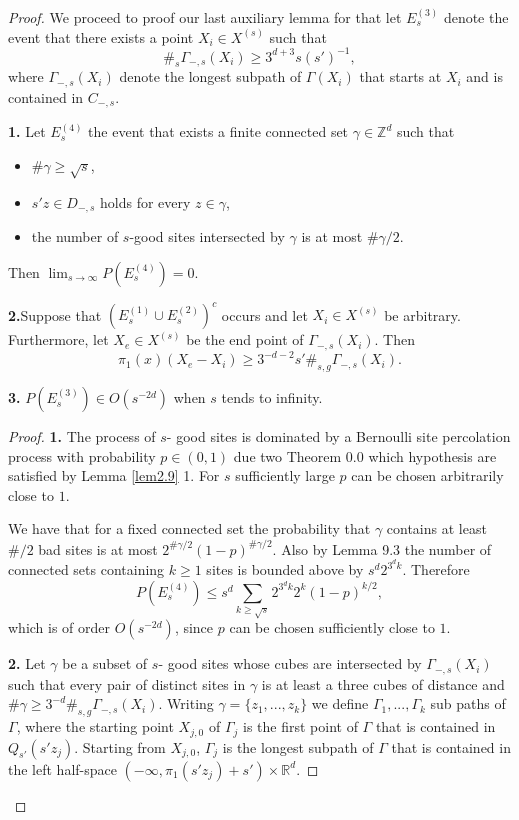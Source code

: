 \begin{proof}
We proceed to proof our last auxiliary lemma for that let $E^{(3)}_s$ denote the event that there exists a point $X_i\in X^{(s)}$ such that $$\#_s\Gamma_{-,s}(X_i)\geq 3^{d+3}s(s')^{-1},$$ where $\Gamma_{-,s}(X_i)$ denote the longest subpath of $\Gamma (X_i)$ that starts at $X_i$ and is contained in $C_{-,s}$.

\begin{lem}\label{lem2.10}

\textbf{1.} Let $E^{(4)}_s$ the event that exists a finite connected set $\gamma\in\mathbb{Z}^d$ such that
\begin{itemize}
\item $\#\gamma\geq \sqrt{s}$,
\item $s'z\in D_{-,s}$ holds for every $z\in\gamma$,
\item the number of $s$-good sites intersected by $\gamma$ is at most $\#\gamma/2$.
\end{itemize}
Then $\lim_{s\rightarrow\infty}P(E_s^{(4)})=0.$

\textbf{2.}Suppose that $(E_s^{(1)}\cup E_s^{(2)})^c$ occurs and let $X_i\in X^{(s)}$ be arbitrary. Furthermore, let $X_e\in X^{(s)}$ be the end point of $\Gamma_{-,s}(X_i)$. Then $$\pi_1(x)(X_e-X_i)\geq 3^{-d-2}s'\#_{s,g}\Gamma_{-,s}(X_i).$$

\textbf{3. } $P(E^{(3)}_s)\in O(s^{-2d})$ when $s$ tends to infinity.

\end{lem}
\begin{proof}

\textbf{1.} The process of $s$- good sites is dominated by a Bernoulli site percolation process with probability $p\in (0,1)$ due two \cite{Lig} Theorem 0.0 which hypothesis are satisfied by Lemma \ref{lem2.9} 1. For $s$ sufficiently large $p$ can be chosen arbitrarily close to $1$.

We have that for a fixed connected set the probability that $\gamma$ contains at least $\#/2$ bad sites is at most $2^{\#\gamma/2}(1-p)^{\#\gamma/2}$. Also by \cite{Pen} Lemma 9.3 the number of connected sets containing $k\geq 1$ sites is bounded above by $s^d 2^{3^d k}$. Therefore 
$$P(E_s^{(4)})\leq s^d\sum_{k\geq \sqrt{s}}2^{3^d k}2^k(1-p)^{k/2}, $$
which is of order $O(s^{-2d})$, since $p$ can be chosen sufficiently close to $1$.

\textbf{2.} Let $\gamma$ be a subset of $s$- good sites whose cubes are intersected by $\Gamma_{-,s}(X_i)$ such that every pair of distinct sites in $\gamma$ is at least a three cubes of distance and $\# \gamma\geq 3^{-d}\#_{s,g}\Gamma_{-,s}(X_i)$. Writing $\gamma=\lbrace z_1, ...,z_k\rbrace$ we define $\Gamma_1, ...,\Gamma_k$ sub paths of $\Gamma$, where the starting point $X_{j,0}$ of $\Gamma_j$ is the first point of $\Gamma$ that is contained in $Q_{s'}(s'z_j)$. Starting from $X_{j,0}$, $\Gamma_j$ is the longest subpath of $\Gamma$ that is contained in the left half-space $(-\infty, \pi_1(s'z_j)+s')\times\mathbb{R}^d$.


\end{proof}
\end{proof}
